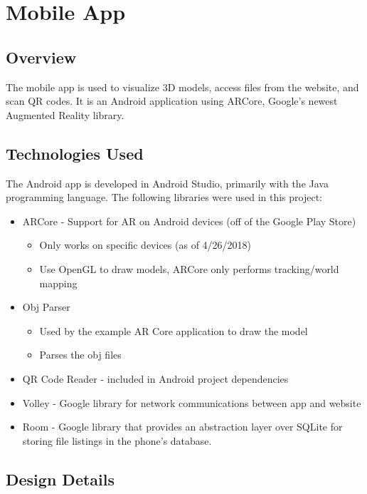 
\section{Mobile App}

    \subsection{Overview}
The mobile app is used to visualize 3D models, access files from the website, and scan QR codes. It is an Android application using ARCore, Google's newest Augmented Reality library.
    \subsection{Technologies Used}
The Android app is developed in Android Studio, primarily with the Java programming language. The following libraries were used in this project:
    \begin{itemize}
        \item ARCore - Support for AR on Android devices (off of the Google Play Store)
        \begin{itemize}
            \item Only works on specific devices (as of 4/26/2018)
            \item Use OpenGL to draw models, ARCore only performs tracking/world mapping
        \end{itemize}
        \item Obj Parser
        \begin{itemize}
            \item Used by the example AR Core application to draw the model
            \item Parses the obj files
        \end{itemize}
        \item QR Code Reader - included in Android project dependencies
        \item Volley - Google library for network communications between app and website
        \item Room - Google library that provides an abstraction layer over SQLite for storing file listings in the phone's database.
    \end{itemize}

    \subsection{Design Details}
    
